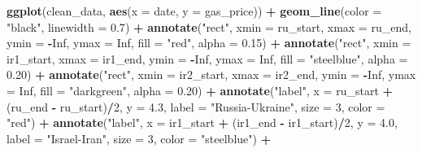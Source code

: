 \documentclass[
]{article}
\newenvironment{Shaded}{\begin{snugshade}}{\end{snugshade}}
\newcommand{\AttributeTok}[1]{\textcolor[rgb]{0.13,0.29,0.53}{#1}}
\newcommand{\ConstantTok}[1]{\textcolor[rgb]{0.56,0.35,0.01}{#1}}
\newcommand{\DecValTok}[1]{\textcolor[rgb]{0.00,0.00,0.81}{#1}}
\newcommand{\FloatTok}[1]{\textcolor[rgb]{0.00,0.00,0.81}{#1}}
\newcommand{\FunctionTok}[1]{\textcolor[rgb]{0.13,0.29,0.53}{\textbf{#1}}}
\newcommand{\NormalTok}[1]{#1}
\newcommand{\SpecialCharTok}[1]{\textcolor[rgb]{0.81,0.36,0.00}{\textbf{#1}}}
\newcommand{\StringTok}[1]{\textcolor[rgb]{0.31,0.60,0.02}{#1}}
\begin{document}
\begin{Shaded}
\begin{Highlighting}[]
\FunctionTok{ggplot}\NormalTok{(clean\_data, }\FunctionTok{aes}\NormalTok{(}\AttributeTok{x =}\NormalTok{ date, }\AttributeTok{y =}\NormalTok{ gas\_price)) }\SpecialCharTok{+}
  \FunctionTok{geom\_line}\NormalTok{(}\AttributeTok{color =} \StringTok{"black"}\NormalTok{, }\AttributeTok{linewidth =} \FloatTok{0.7}\NormalTok{) }\SpecialCharTok{+}
  \FunctionTok{annotate}\NormalTok{(}\StringTok{"rect"}\NormalTok{, }\AttributeTok{xmin =}\NormalTok{ ru\_start,  }\AttributeTok{xmax =}\NormalTok{ ru\_end,}
           \AttributeTok{ymin =} \SpecialCharTok{{-}}\ConstantTok{Inf}\NormalTok{, }\AttributeTok{ymax =} \ConstantTok{Inf}\NormalTok{, }\AttributeTok{fill =} \StringTok{"red"}\NormalTok{,       }\AttributeTok{alpha =} \FloatTok{0.15}\NormalTok{) }\SpecialCharTok{+}
  \FunctionTok{annotate}\NormalTok{(}\StringTok{"rect"}\NormalTok{, }\AttributeTok{xmin =}\NormalTok{ ir1\_start, }\AttributeTok{xmax =}\NormalTok{ ir1\_end,}
           \AttributeTok{ymin =} \SpecialCharTok{{-}}\ConstantTok{Inf}\NormalTok{, }\AttributeTok{ymax =} \ConstantTok{Inf}\NormalTok{, }\AttributeTok{fill =} \StringTok{"steelblue"}\NormalTok{, }\AttributeTok{alpha =} \FloatTok{0.20}\NormalTok{) }\SpecialCharTok{+}
  \FunctionTok{annotate}\NormalTok{(}\StringTok{"rect"}\NormalTok{, }\AttributeTok{xmin =}\NormalTok{ ir2\_start, }\AttributeTok{xmax =}\NormalTok{ ir2\_end,}
           \AttributeTok{ymin =} \SpecialCharTok{{-}}\ConstantTok{Inf}\NormalTok{, }\AttributeTok{ymax =} \ConstantTok{Inf}\NormalTok{, }\AttributeTok{fill =} \StringTok{"darkgreen"}\NormalTok{, }\AttributeTok{alpha =} \FloatTok{0.20}\NormalTok{) }\SpecialCharTok{+}
  \FunctionTok{annotate}\NormalTok{(}\StringTok{"label"}\NormalTok{, }\AttributeTok{x =}\NormalTok{ ru\_start  }\SpecialCharTok{+}\NormalTok{ (ru\_end  }\SpecialCharTok{{-}}\NormalTok{ ru\_start)}\SpecialCharTok{/}\DecValTok{2}\NormalTok{,  }\AttributeTok{y =} \FloatTok{4.3}\NormalTok{,}
           \AttributeTok{label =} \StringTok{"Russia{-}Ukraine"}\NormalTok{, }\AttributeTok{size =} \DecValTok{3}\NormalTok{, }\AttributeTok{color =} \StringTok{"red"}\NormalTok{) }\SpecialCharTok{+}
  \FunctionTok{annotate}\NormalTok{(}\StringTok{"label"}\NormalTok{, }\AttributeTok{x =}\NormalTok{ ir1\_start }\SpecialCharTok{+}\NormalTok{ (ir1\_end }\SpecialCharTok{{-}}\NormalTok{ ir1\_start)}\SpecialCharTok{/}\DecValTok{2}\NormalTok{, }\AttributeTok{y =} \FloatTok{4.0}\NormalTok{,}
           \AttributeTok{label =} \StringTok{"Israel{-}Iran"}\NormalTok{, }\AttributeTok{size =} \DecValTok{3}\NormalTok{, }\AttributeTok{color =} \StringTok{"steelblue"}\NormalTok{) }\SpecialCharTok{+}

\end{Highlighting}
\end{Shaded}
\end{document}

